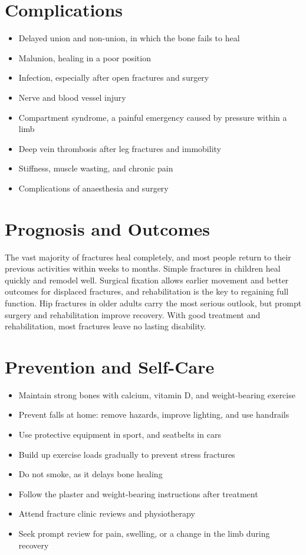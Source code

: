 \section*{Complications}
\begin{itemize}
    \item Delayed union and non-union, in which the bone fails to heal
    \item Malunion, healing in a poor position
    \item Infection, especially after open fractures and surgery
    \item Nerve and blood vessel injury
    \item Compartment syndrome, a painful emergency caused by pressure within a limb
    \item Deep vein thrombosis after leg fractures and immobility
    \item Stiffness, muscle wasting, and chronic pain
    \item Complications of anaesthesia and surgery
\end{itemize}

\section*{Prognosis and Outcomes}
The vast majority of fractures heal completely, and most people return to their previous activities within weeks to months. Simple fractures in children heal quickly and remodel well. Surgical fixation allows earlier movement and better outcomes for displaced fractures, and rehabilitation is the key to regaining full function. Hip fractures in older adults carry the most serious outlook, but prompt surgery and rehabilitation improve recovery. With good treatment and rehabilitation, most fractures leave no lasting disability.

\section*{Prevention and Self-Care}
\begin{itemize}
    \item Maintain strong bones with calcium, vitamin D, and weight-bearing exercise
    \item Prevent falls at home: remove hazards, improve lighting, and use handrails
    \item Use protective equipment in sport, and seatbelts in cars
    \item Build up exercise loads gradually to prevent stress fractures
    \item Do not smoke, as it delays bone healing
    \item Follow the plaster and weight-bearing instructions after treatment
    \item Attend fracture clinic reviews and physiotherapy
    \item Seek prompt review for pain, swelling, or a change in the limb during recovery
\end{itemize}


